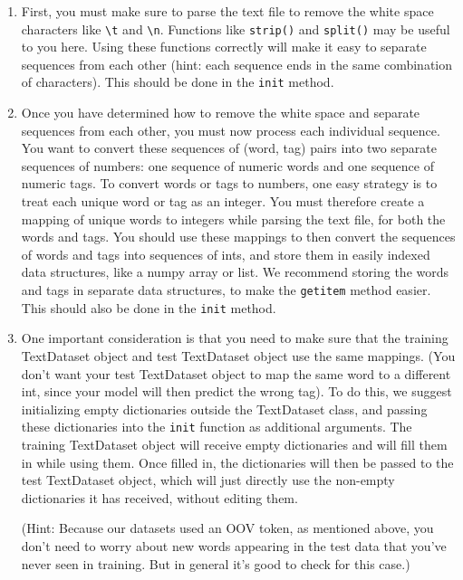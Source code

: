 \documentclass[11pt,addpoints,answers]{exam}
\begin{document}
\begin{enumerate}
    \item First, you must make sure to parse the text file to remove the white space characters like \texttt{\textbackslash t} and \texttt{\textbackslash n}. Functions like \texttt{strip()} and \texttt{split()} may be useful to you here. Using these functions correctly will make it easy to separate sequences from each other (hint: each sequence ends in the same combination of characters). This should be done in the \texttt{init} method.
    \item  Once you have determined how to remove the white space and separate sequences from each other, you must now process each individual sequence. You want to convert these sequences of (word, tag) pairs into two separate sequences of numbers: one sequence of numeric words and one sequence of numeric tags. To convert words or tags to numbers, one easy strategy is to treat each unique word or tag as an integer. You must therefore create a mapping of unique words to integers while parsing the text file, for both the words and tags. You should use these mappings to then convert the sequences of words and tags into sequences of ints, and store them in easily indexed data structures, like a numpy array or list. We recommend storing the words and tags in separate data structures, to make the \texttt{getitem} method easier. This should also be done in the \texttt{init} method.     
    \item One important consideration is that you need to make sure that the training TextDataset object and test TextDataset object use the same mappings. (You don't want your test TextDataset object to map the same word to a different int, since your model will then predict the wrong tag). To do this, we suggest initializing empty dictionaries outside the TextDataset class, and passing these dictionaries into the \texttt{init} function as additional arguments. The training TextDataset object will receive empty dictionaries and will fill them in while using them. Once filled in, the dictionaries will then be passed to the test TextDataset object, which will just directly use the non-empty dictionaries it has received, without editing them.

    (Hint: Because our datasets used an OOV token, as mentioned above, you don't need to worry about new words appearing in the test data that you've never seen in training. But in general it's good to check for this case.)
    

\end{enumerate}
\end{document}

